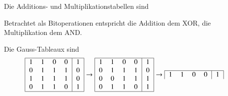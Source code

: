 \begin{loesung}
\begin{teilaufgaben}
\item
Die Additions- und Multiplikationstabellen sind
\begin{center}
\end{center}
Betrachtet als Bitoperationen entspricht die Addition dem XOR, die
Multiplikation dem AND.
\item
Die Gauss-Tableaux sind
\begin{align*}
\begin{tabular}{|>{$}c<{$}>{$}c<{$}>{$}c<{$}>{$}c<{$}|>{$}c<{$}|}
\hline
   1 & 1 & 0 & 0 &  1\\
   0 & 1 & 1 & 1 &  0\\
   1 & 1 & 1 & 1 &  0\\
   0 & 1 & 1 & 0 &  1\\
\hline
\end{tabular}
&\to
\begin{tabular}{|>{$}c<{$}>{$}c<{$}>{$}c<{$}>{$}c<{$}|>{$}c<{$}|}
\hline
   1 & 1 & 0 & 0 &  1\\
   0 & 1 & 1 & 1 &  0\\
   0 & 0 & 1 & 1 &  1\\
   0 & 1 & 1 & 0 &  1\\
\hline
\end{tabular}
\to
\begin{tabular}{|>{$}c<{$}>{$}c<{$}>{$}c<{$}>{$}c<{$}|>{$}c<{$}|}
\hline
   1 & 1 & 0 & 0 &  1\\

\end{tabular}
\end{align*}
\end{teilaufgaben}
\end{loesung}
